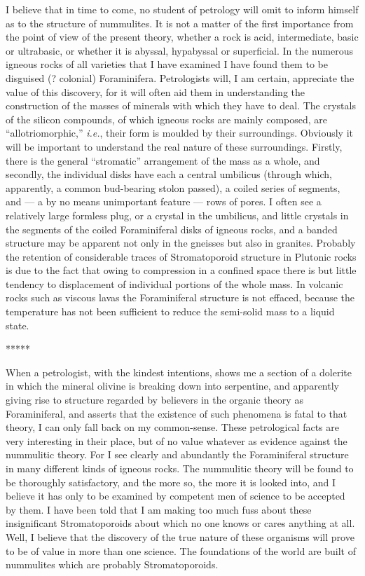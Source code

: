 \documentclass[a4paper, 12pt, oneside]{article}
\begin{document}
I believe that in time to come, no student of petrology will omit to inform himself as to the structure of nummulites. It is not a matter of the first importance from the point of view of the present theory, whether a rock is acid, intermediate, basic or ultrabasic, or whether it is abyssal, hypabyssal or superficial. In the numerous igneous rocks of all varieties that I have examined I have found them to be disguised (? colonial) Foraminifera. Petrologists will, I am certain, appreciate the value of this discovery, for it will often aid them in understanding the construction of the masses of minerals with which they have to deal. The crystals of the silicon compounds, of which igneous rocks are mainly composed, are ``allotriomorphic,'' \emph{i.e.}, their form is moulded by their surroundings. Obviously it will be important to understand the real nature of these surroundings. Firstly, there is the general ``stromatic'' arrangement of the mass as a whole, and secondly, the individual disks have each a central umbilicus (through which, apparently, a common bud-bearing stolon passed), a coiled series of segments, and --- a by no means unimportant feature --- rows of pores. I often see a relatively large formless plug, or a crystal in the umbilicus, and little crystals in the segments of the coiled Foraminiferal disks of igneous rocks, and a banded structure may be apparent not only in the gneisses but also in granites. Probably the retention of considerable traces of Stromatoporoid structure in Plutonic rocks is due to the fact that owing to compression in a confined space there is but little tendency to displacement of individual portions of the whole mass. In volcanic rocks such as viscous lavas the Foraminiferal structure is not effaced, because the temperature has not been sufficient to reduce the semi-solid mass to a liquid state.

\centerline{*\hspace{15mm}*\hspace{15mm}*\hspace{15mm}*\hspace{15mm}*}
\bigskip

When a petrologist, with the kindest intentions, shows me a section of a dolerite in which the mineral olivine is breaking down into serpentine, and apparently giving rise to structure regarded by believers in the organic theory as Foraminiferal, and asserts that the existence of such phenomena is fatal to that theory, I can only fall back on my common-sense. These petrological facts are very interesting in their place, but of no value whatever as evidence against the nummulitic theory. For I see clearly and abundantly the Foraminiferal structure in many different kinds of igneous rocks. The nummulitic theory will be found to be thoroughly satisfactory, and the more so, the more it is looked into, and I believe it has only to be examined by competent men of science to be accepted by them. I have been told that I am making too much fuss about these insignificant Stromatoporoids about which no one knows or cares anything at all. Well, I believe that the discovery of the true nature of these organisms will prove to be of value in more than one science. The foundations of the world are built of nummulites which are probably Stromatoporoids.
\end{document}
